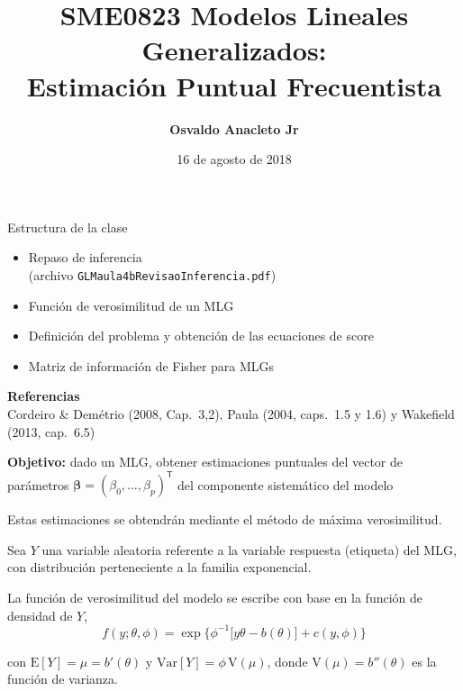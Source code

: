 \documentclass{beamer}
\title{SME0823 Modelos Lineales Generalizados:\\ Estimación Puntual Frecuentista}
\author{\textbf{Osvaldo Anacleto Jr}}
\institute{\textbf{ICMC-USP}}
\date{16 de agosto de 2018}
\begin{document}
\begin{frame}[plain]
  \titlepage
\end{frame}

\begin{frame}
  \begin{block}{Estructura de la clase}
    \begin{itemize}
      \item Repaso de inferencia\\
            (archivo \texttt{GLMaula4bRevisaoInferencia.pdf})
      \vspace{0.8em}
      \item Función de verosimilitud de un MLG
      \vspace{0.8em}
      \item Definición del problema y obtención de las ecuaciones de score
      \vspace{0.8em}
      \item Matriz de información de Fisher para MLGs
    \end{itemize}
  \end{block}

  \vspace{2em}
  {\color{blue}\bfseries Referencias}\\
  Cordeiro \& Demétrio (2008, Cap.~3,2), Paula (2004, caps.~1.5 y 1.6)
  y Wakefield (2013, cap.~6.5)
\end{frame}

\begin{frame}
  \colorbox{violet!60!black}{%
    \parbox{\dimexpr\linewidth-2\fboxsep}{\color{white}
      {\color{yellow!80!orange}\bfseries Objetivo:} dado un MLG, obtener
      estimaciones puntuales del vector de parámetros
      $\bm{\beta}=(\beta_0,\dots,\beta_p)^{\mathsf{T}}$ del componente
      sistemático del modelo}}

  \vspace{1em}
  Estas estimaciones se obtendrán mediante el método de máxima
  verosimilitud.

  \vspace{0.8em}
  Sea $Y$ una variable aleatoria referente a la variable respuesta (etiqueta)
  del MLG, con distribución perteneciente a la familia exponencial.

  \vspace{0.8em}
  La función de verosimilitud del modelo se escribe con base en la función
  de densidad de $Y$,
  \begin{equation}
    f(y;\theta,\phi)=\exp\Big\{\phi^{-1}\big[y\theta-b(\theta)\big]+c(y,\phi)\Big\}
  \end{equation}

  \vspace{0.5em}
  con $\mathrm{E}[Y]=\mu=b'(\theta)$ y $\mathrm{Var}[Y]=\phi\,\mathrm{V}(\mu)$,
  donde $\mathrm{V}(\mu)=b''(\theta)$ es la función de varianza.
\end{frame}
\end{document}
